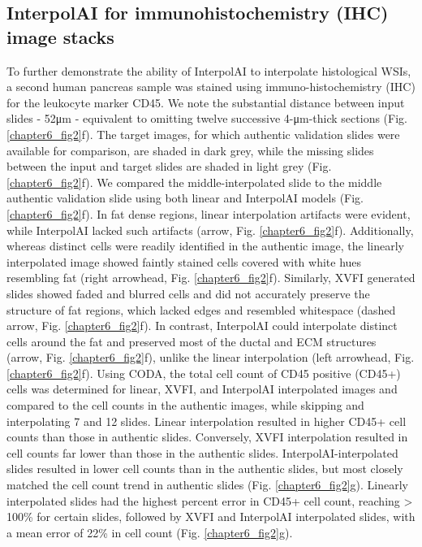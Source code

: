 \begin{refsection}
    \section{InterpolAI for immunohistochemistry (IHC) image stacks}
    To further demonstrate the ability of InterpolAI to interpolate histological WSIs, a second human pancreas sample was stained using immuno-histochemistry (IHC) for the leukocyte marker CD45. We note the substantial distance between input slides - 52μm - equivalent to omitting twelve successive 4-μm-thick sections (Fig. \ref{chapter6_fig2}f). The target images, for which authentic validation slides were available for comparison, are shaded in dark grey, while the missing slides between the input and target slides are shaded in light grey (Fig. \ref{chapter6_fig2}f). 
    We compared the middle-interpolated slide to the middle authentic validation slide using both linear and InterpolAI models (Fig. \ref{chapter6_fig2}f). In fat dense regions, linear interpolation artifacts were evident, while InterpolAI lacked such artifacts (arrow, Fig. \ref{chapter6_fig2}f). Additionally, whereas distinct cells were readily identified in the authentic image, the linearly interpolated image showed faintly stained cells covered with white hues resembling fat (right arrowhead, Fig. \ref{chapter6_fig2}f). Similarly, XVFI generated slides showed faded and blurred cells and did not accurately preserve the structure of fat regions, which lacked edges and resembled whitespace (dashed arrow, Fig. \ref{chapter6_fig2}f). In contrast, InterpolAI could interpolate distinct cells around the fat and preserved most of the ductal and ECM structures (arrow, Fig. \ref{chapter6_fig2}f), unlike the linear interpolation (left arrowhead, Fig. \ref{chapter6_fig2}f).
    Using CODA, the total cell count of CD45 positive (CD45+) cells was determined for linear, XVFI, and InterpolAI interpolated images and compared to the cell counts in the authentic images, while skipping and interpolating 7 and 12 slides. Linear interpolation resulted in higher CD45+ cell counts than those in authentic slides. Conversely, XVFI interpolation resulted in cell counts far lower than those in the authentic slides. InterpolAI-interpolated slides resulted in lower cell counts than in the authentic slides, but most closely matched the cell count trend in authentic slides (Fig. \ref{chapter6_fig2}g). Linearly interpolated slides had the highest percent error in CD45+ cell count, reaching > 100\% for certain slides, followed by XVFI and InterpolAI interpolated slides, with a mean error of 22\% in cell count (Fig. \ref{chapter6_fig2}g).

\end{refsection}
